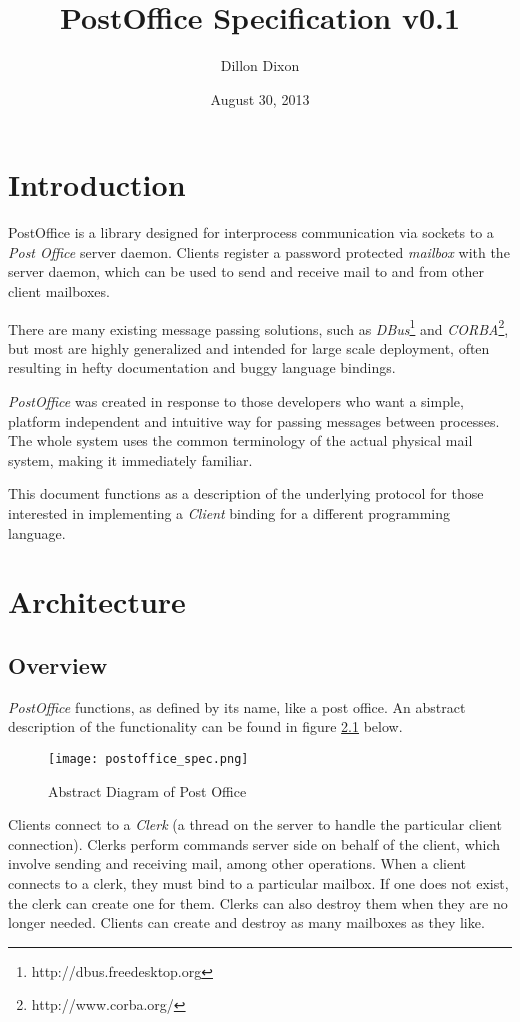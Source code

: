 \documentclass[10pt]{report}
\title{\textbf{PostOffice Specification v0.1}}
\author{Dillon Dixon}
\date{August 30, 2013}
\begin{document}
\maketitle
\tableofcontents

\chapter{Introduction}

PostOffice is a library designed for interprocess communication via sockets to a \emph{Post Office} server daemon. Clients register a password protected \emph{mailbox} with the server daemon, which can be used to send and receive mail to and from other client mailboxes.

There are many existing message passing solutions, such as \emph{DBus}\footnote{http://dbus.freedesktop.org} and \emph{CORBA}\footnote{http://www.corba.org/}, but most are highly generalized and intended for large scale deployment, often resulting in hefty documentation and buggy language bindings.

\emph{PostOffice} was created in response to those developers who want a simple, platform independent and intuitive way for passing messages between processes. The whole system uses the common terminology of the actual physical mail system, making it immediately familiar.

This document functions as a description of the underlying protocol for those interested in implementing a \emph{Client} binding for a different programming language.

\chapter{Architecture}

\section{Overview}

\emph{PostOffice} functions, as defined by its name, like a post office. An abstract description of the functionality can be found in figure \ref{fig:post_office} below.

\begin{figure}[H]
\centering
\texttt{[image: postoffice\_spec.png]}
\caption{Abstract Diagram of Post Office}
\label{fig:post_office}
\end{figure}

Clients connect to a \emph{Clerk} (a thread on the server to handle the particular client connection). Clerks perform commands server side on behalf of the client, which involve sending and receiving mail, among other operations. When a client connects to a clerk, they must bind to a particular mailbox. If one does not exist, the clerk can create one for them. Clerks can also destroy them when they are no longer needed. Clients can create and destroy as many mailboxes as they like.
\end{document}
